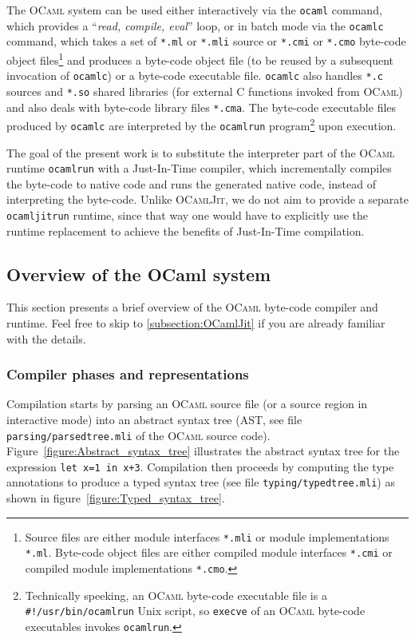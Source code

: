 \documentclass[a4paper]{acm_proc_article-sp}
\begin{document}
The \textsc{OCaml} system can be used either interactively via the \texttt{ocaml} command, which
provides a ``\textit{read, compile, eval}'' loop, or in batch mode via the \texttt{ocamlc}
command, which takes a set of \texttt{*.ml} or \texttt{*.mli} source or \texttt{*.cmi} or
\texttt{*.cmo} byte-code object files\footnote{Source files are either module interfaces
  \texttt{*.mli} or module implementations \texttt{*.ml}. Byte-code object files are either
  compiled module interfaces \texttt{*.cmi} or compiled module implementations \texttt{*.cmo}.}
and produces a byte-code object file (to be reused by a subsequent invocation of \texttt{ocamlc})
or a byte-code executable file. \texttt{ocamlc} also handles \texttt{*.c} sources and \texttt{*.so}
shared libraries (for external C functions invoked from \textsc{OCaml}) and also deals with
byte-code library files \texttt{*.cma}. The byte-code executable files produced by \texttt{ocamlc}
are interpreted by the \texttt{ocamlrun} program\footnote{Technically speeking, an \textsc{OCaml}
  byte-code executable file is a \texttt{\#!/usr/bin/ocamlrun} Unix script, so \texttt{execve}
  of an \textsc{OCaml} byte-code executables invokes \texttt{ocamlrun}.} upon execution.

The goal of the present work is to substitute the interpreter part of the \textsc{OCaml} runtime
\texttt{ocamlrun} with a Just-In-Time compiler, which incrementally compiles the byte-code to
native code and runs the generated native code, instead of interpreting the byte-code. Unlike
\textsc{OCamlJit}\cite{Starynkevitch04}, we do not aim to provide a separate \texttt{ocamljitrun}
runtime, since that way one would have to explicitly use the runtime replacement to achieve the
benefits of Just-In-Time compilation.

\subsection{Overview of the OCaml system}

This section presents a brief overview of the \textsc{OCaml} byte-code compiler and runtime.
Feel free to skip to \ref{subsection:OCamlJit} if you are already familiar with the details.

\subsubsection{Compiler phases and representations}

Compilation starts by parsing an \textsc{OCaml} source file (or a source region in interactive
mode) into an abstract syntax tree (AST, see file \texttt{parsing/parsedtree.mli} of the \textsc{OCaml}
source code). Figure~\ref{figure:Abstract_syntax_tree} illustrates the abstract syntax tree for the expression
\texttt{let x=1 in x+3}. Compilation then proceeds by computing the type annotations to produce
a typed syntax tree (see file \texttt{typing/typedtree.mli}) as shown in figure~\ref{figure:Typed_syntax_tree}.
\end{document}
